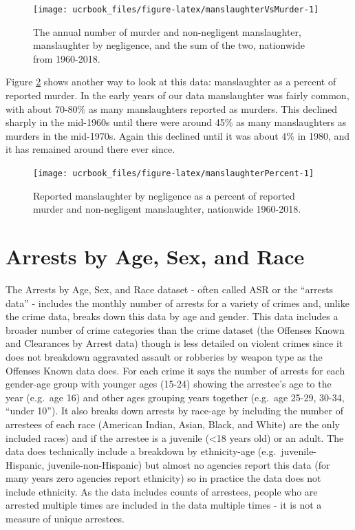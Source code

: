 \documentclass[
  12pt,
  openany]{book}
\begin{document}
\begin{figure}

{\centering \texttt{[image: ucrbook\_files/figure-latex/manslaughterVsMurder-1]} 

}

\caption{The annual number of murder and non-negligent manslaughter, manslaughter by negligence, and the sum of the two, nationwide from 1960-2018.}\label{fig:manslaughterVsMurder}
\end{figure}

Figure \ref{fig:manslaughterPercent} shows another way to look at this data: manslaughter as a percent of reported murder. In the early years of our data manslaughter was fairly common, with about 70-80\% as many manslaughters reported as murders. This declined sharply in the mid-1960s until there were around 45\% as many manslaughters as murders in the mid-1970s. Again this declined until it was about 4\% in 1980, and it has remained around there ever since.

\begin{figure}

{\centering \texttt{[image: ucrbook\_files/figure-latex/manslaughterPercent-1]} 

}

\caption{Reported manslaughter by negligence as a percent of reported murder and non-negligent manslaughter, nationwide 1960-2018.}\label{fig:manslaughterPercent}
\end{figure}

\hypertarget{arrests}{%
\chapter{Arrests by Age, Sex, and Race}\label{arrests}}

The Arrests by Age, Sex, and Race dataset - often called ASR or the ``arrests data'' - includes the monthly number of arrests for a variety of crimes and, unlike the crime data, breaks down this data by age and gender. This data includes a broader number of crime categories than the crime dataset (the Offenses Known and Clearances by Arrest data) though is less detailed on violent crimes since it does not breakdown aggravated assault or robberies by weapon type as the Offenses Known data does. For each crime it says the number of arrests for each gender-age group with younger ages (15-24) showing the arrestee's age to the year (e.g.~age 16) and other ages grouping years together (e.g.~age 25-29, 30-34, ``under 10''). It also breaks down arrests by race-age by including the number of arrestees of each race (American Indian, Asian, Black, and White) are the only included races) and if the arrestee is a juvenile (\textless18 years old) or an adult. The data does technically include a breakdown by ethnicity-age (e.g.~juvenile-Hispanic, juvenile-non-Hispanic) but almost no agencies report this data (for many years zero agencies report ethnicity) so in practice the data does not include ethnicity. As the data includes counts of arrestees, people who are arrested multiple times are included in the data multiple times - it is not a measure of unique arrestees.
\end{document}
